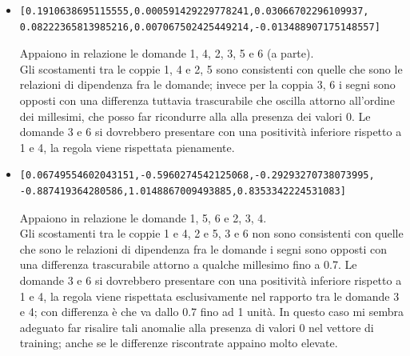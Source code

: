 \begin{itemize}
\item \begin{verbatim}[0.1910638695115555,0.000591429229778241,0.03066702296109937,
0.08222365813985216,0.007067502425449214,-0.013488907175148557]
\end{verbatim}
Appaiono in relazione le domande 1, 4, 2, 3, 5 e 6 (a parte).\\
Gli scostamenti tra le coppie 1, 4 e 2, 5 sono consistenti con quelle che sono le relazioni di dipendenza fra le domande; invece per la coppia 3, 6 i segni sono opposti con una differenza tuttavia trascurabile  che oscilla attorno all'ordine dei millesimi, che posso far ricondurre alla alla presenza dei valori 0.
Le domande 3 e 6 si dovrebbero presentare con una positivit\`a inferiore rispetto a 1 e 4, la regola viene rispettata pienamente.

\item \begin{verbatim}[0.06749554602043151,-0.5960274542125068,-0.29293270738073995,
-0.887419364280586,1.0148867009493885,0.8353342224531083]
\end{verbatim}
Appaiono in relazione le domande 1, 5, 6 e 2, 3, 4.\\
Gli scostamenti tra le coppie 1 e 4, 2 e 5, 3 e 6 non sono consistenti con quelle che sono le relazioni di dipendenza fra le domande i segni sono opposti con una differenza trascurabile attorno a qualche millesimo fino a 0.7. 
Le domande 3 e 6 si dovrebbero presentare con una positivit\`a inferiore rispetto a 1 e 4, la regola viene rispettata  esclusivamente nel rapporto tra le domande 3 e 4; con differenza \`e che va dallo 0.7 fino ad 1 unit\`a. In questo caso  mi sembra adeguato far risalire tali anomalie alla presenza di valori 0 nel vettore di training; anche se le differenze riscontrate appaino molto elevate.
\end{itemize}


